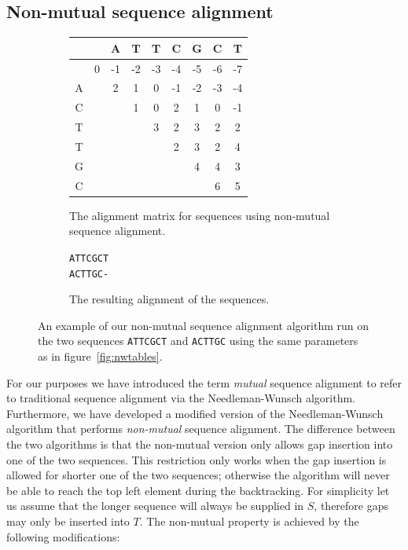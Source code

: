 \documentclass[a4paper]{report}
\begin{document}
\subsection{Non-mutual sequence alignment}
\label{sec:nonmutualalign}

\begin{figure}[t]
    \begin{subfigure}[b]{0.55\textwidth}
        \centering
        \begin{tabular}{| c | c | c | c | c | c | c | c | c |}
            \hline
            & & A & T & T & C & G & C & T \\ \hline
            &\cellcolor[gray]{0.9}0 & -1 & -2 & -3 & -4 & -5 & -6 & -7 \\
            \hline
            A & &\cellcolor[gray]{0.9}2 & 1 & 0 & -1 & -2 & -3 & -4 \\
            \hline
            C & & &\cellcolor[gray]{0.9}1 & 0 & 2 & 1 & 0 & -1 \\ \hline
            T & & & &\cellcolor[gray]{0.9}3 & 2 & 3 & 2 & 2 \\ \hline
            T & & & & &\cellcolor[gray]{0.9}2 & 3 & 2 & 4 \\ \hline
            G & & & & & &\cellcolor[gray]{0.9}4 & 4 & 3 \\ \hline
            C & & & & & & &\cellcolor[gray]{0.9}6 &
            \cellcolor[gray]{0.9}5 \\ \hline
        \end{tabular}
        \caption{The alignment matrix for sequences using non-mutual sequence
        alignment.}
        \label{fig:nonmutmatrix}
    \end{subfigure}
    \quad
    \begin{subfigure}[b]{0.4\textwidth}
        \centering
        \texttt{ATTCGCT\\ACTTGC-}
        \caption{The resulting alignment of the sequences.}
        \label{fig:nonmutalign}
    \end{subfigure}
    \caption{An example of our non-mutual sequence alignment algorithm run on
    the two sequences \texttt{ATTCGCT} and \texttt{ACTTGC} using the same
    parameters as in figure~\ref{fig:nwtables}.}
    \label{fig:nonmuttables}
\end{figure}

For our purposes we have introduced the term \emph{mutual} sequence alignment
to refer to traditional sequence alignment via the Needleman-Wunsch algorithm.
Furthermore, we have developed a modified version of the Needleman-Wunsch
algorithm that performs \emph{non-mutual} sequence alignment. The difference
between the two algorithms is that the non-mutual version only allows gap
insertion into one of the two sequences. This restriction only works when the
gap insertion is allowed for shorter one of the two sequences; otherwise the
algorithm will never be able to reach the top left element during the
backtracking. For simplicity let us assume that the longer sequence will always
be supplied in $S$, therefore gaps may only be inserted into $T$. The
non-mutual property is achieved by the following modifications:
\end{document}
